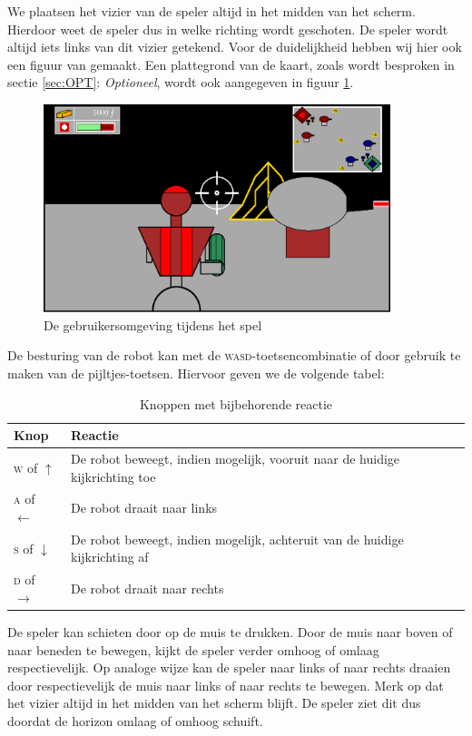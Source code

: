 \documentclass[a4paper,11pt, twoside]{article}
\begin{document}
    We plaatsen het vizier van de speler altijd in het midden van het scherm. Hierdoor weet de speler dus in welke richting wordt geschoten. De speler wordt altijd iets links van dit vizier getekend. Voor de duidelijkheid hebben wij hier ook een figuur van gemaakt. Een plattegrond van de kaart, zoals wordt besproken in sectie \ref{sec:OPT}: \emph{Optioneel}, wordt ook aangegeven in figuur \ref{fig:UI}.
    \begin{figure}[H]
    \includegraphics[width=0.9\textwidth]{../Graphics/UI.eps}
    \caption{De gebruikersomgeving tijdens het spel}
    \label{fig:UI}
    \end{figure}
    De besturing van de robot kan met de \textsc{wasd}-toetsencombinatie of door gebruik te maken van de pijltjes-toetsen. Hiervoor geven we de volgende tabel:
    \begin{table}[H]
        \small
        \centering
        \begin{tabular}{| l | l |}
        \hline
        Knop & Reactie \\ \hline
        \textsc{w} of $\uparrow$ & De robot beweegt, indien mogelijk, vooruit naar de huidige kijkrichting toe \\ \hline
        \textsc{a} of $\leftarrow$ & De robot draait naar links \\ \hline
        \textsc{s} of $\downarrow$ & De robot beweegt, indien mogelijk, achteruit van de huidige kijkrichting af \\ \hline
        \textsc{d} of $\rightarrow$ & De robot draait naar rechts \\ \hline
        \end{tabular}
        \caption{Knoppen met bijbehorende reactie}
        \label{tab:planning}
    \end{table}

    De speler kan schieten door op de muis te drukken. Door de muis naar boven of naar beneden te bewegen, kijkt de speler verder omhoog of omlaag respectievelijk. Op analoge wijze kan de speler naar links of naar rechts draaien door respectievelijk de muis naar links of naar rechts te bewegen. Merk op dat het vizier altijd in het midden van het scherm blijft. De speler ziet dit dus doordat de horizon omlaag of omhoog schuift.
    \FloatBarrier
\end{document}
